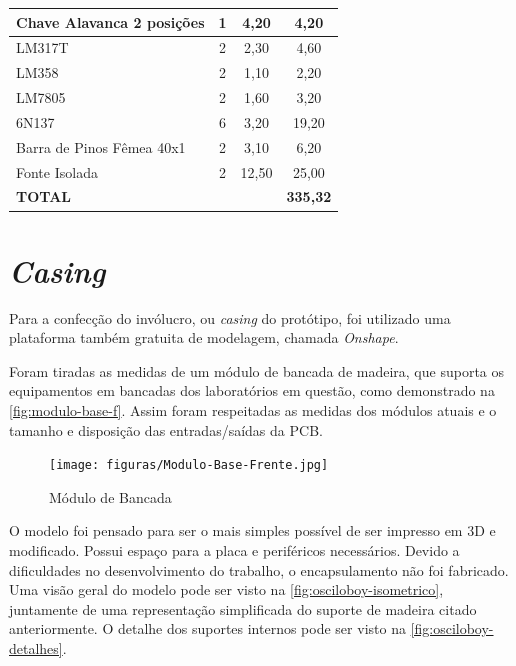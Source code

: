 \begin{table}[h!]
\begin{tabular}{ l c c c }
Chave Alavanca 2 posições & 1 & 4,20 & 4,20 \\ \hline
LM317T & 2 & 2,30 & 4,60 \\ \hline
LM358 & 2 & 1,10 & 2,20 \\ \hline
LM7805 & 2 & 1,60 & 3,20 \\ \hline
6N137 & 6 & 3,20 & 19,20 \\ \hline
Barra de Pinos Fêmea 40x1 & 2 & 3,10 & 6,20 \\ \hline
Fonte Isolada & 2 & 12,50 & 25,00 \\ \hline
\textbf{TOTAL} &  &  & \textbf{335,32} \\ \hline
\end{tabular}
\fonte{}
\end{table}


\section{\textit{Casing}}\label{Casing}

Para a confecção do invólucro, ou \textit{casing} do protótipo, foi utilizado uma plataforma também gratuita de modelagem, chamada \textit{Onshape}.

Foram tiradas as medidas de um módulo de bancada de madeira, que suporta os equipamentos em bancadas dos laboratórios em questão, como demonstrado na \autoref{fig:modulo-base-f}. Assim foram respeitadas as medidas dos módulos atuais e o tamanho e disposição das entradas/saídas da \gls{PCB}.

\begin{figure}[htb!]
    \caption{Módulo de Bancada}
    \vspace*{5mm}
    \label{fig:modulo-base-f}
    \texttt{[image: figuras/Modulo-Base-Frente.jpg]}
    \fonte{}
\end{figure}

O modelo foi pensado para ser o mais simples possível de ser impresso em 3D e modificado. Possui espaço para a placa e periféricos necessários.
Devido a dificuldades no desenvolvimento do trabalho, o encapsulamento não foi fabricado.
Uma visão geral do modelo pode ser visto na \autoref{fig:osciloboy-isometrico}, juntamente de uma representação simplificada do suporte de madeira citado anteriormente.
O detalhe dos suportes internos pode ser visto na \autoref{fig:osciloboy-detalhes}.

